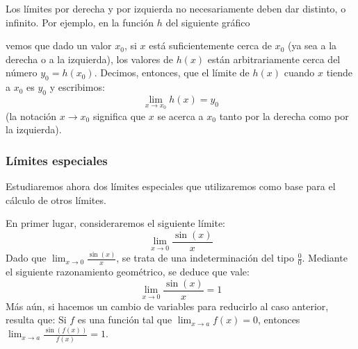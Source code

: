 \documentclass[../Teoría.root.tex]{subfiles}
\begin{document}
Los límites por derecha y por izquierda no necesariamente deben dar distinto, o infinito.
Por ejemplo, en la función \(h\) del siguiente gráfico
\begin{center}
\end{center}
vemos que dado un valor \(x_0\), si \(x\) está suficientemente cerca de \(x_0\) (ya sea a la derecha o a la izquierda), los valores de \(h(x)\) están arbitrariamente cerca del número \(y_0=h(x_0)\).
Decimos, entonces, que el límite de \(h(x)\) cuando \(x\) tiende a \(x_0\) es \(y_0\) y escribimos:
\[\lim_{x\to x_0}h(x)=y_0\]
(la notación \(x\to x_0\) significa que \(x\) se acerca a \(x_0\) tanto por la derecha como por la izquierda).
\subsubsection{Límites especiales}
Estudiaremos ahora dos límites especiales que utilizaremos como base para el cálculo de otros límites.

En primer lugar, consideraremos el siguiente límite:
\[\lim_{x\to0}\frac{\sin(x)}{x}\]
Dado que \(\lim_{x\to0}\frac{\sin(x)}{x}\), se trata de una indeterminación del tipo \(\frac{0}{0}\).
Mediante el siguiente razonamiento geométrico, se deduce que vale:
\[\lim_{x\to0}\frac{\sin(x)}{x}=1\]
Más aún, si hacemos un cambio de variables para reducirlo al caso anterior, resulta que:
Si \(f\) es una función tal que \(\lim_{x\to a}f(x)=0\), entonces \(\lim_{x\to a}\frac{\sin(f(x))}{f(x)}=1\).
\end{document}

